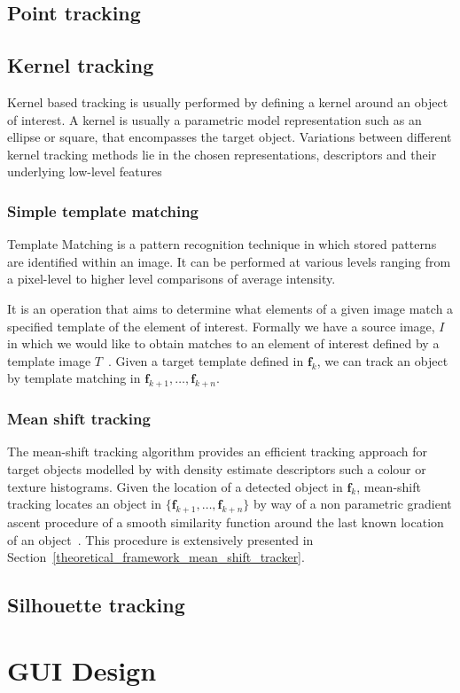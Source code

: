 
\subsection{Point tracking}


\subsection{Kernel tracking}
Kernel based tracking is usually performed by defining a kernel around an object
of interest. A kernel is usually a parametric model representation such as an
ellipse or square, that encompasses the target object. 
Variations between different kernel tracking methods lie in the chosen representations,
descriptors and their underlying low-level features~\cite{Prajapati2015}

\subsubsection{Simple template matching}
Template Matching is a pattern recognition technique in which stored patterns 
are identified within an image. It can be performed at various levels ranging
from a pixel-level to higher level comparisons of average intensity.

It is an operation that aims to determine what elements of a given image match a
specified template of the element of interest. Formally we have a source image,
$I$ in which we would like to obtain matches to an element of interest defined
by a template image $T$~\cite{Brunelli}. 
Given a target template defined in $\mathbf{f}_k$, we can track an object by 
template matching in $\mathbf{f}_{k+1},\ldots,\mathbf{f}_{k+n}$.

\subsubsection{Mean shift tracking}\label{literature_review_mean_shift}
The mean-shift tracking algorithm provides an efficient tracking approach for
target objects modelled by with density estimate descriptors such a colour or
texture histograms. 
Given the location of a detected object in $\mathbf{f}_k$, mean-shift tracking
locates an object in $\{\mathbf{f}_{k+1},\ldots,\mathbf{f}_{k+n}\}$ by way of a
non parametric gradient ascent procedure of a smooth similarity function around
the last known location of an object~\cite{Comaniciu2003}. This procedure is
extensively presented in Section~\ref{theoretical_framework_mean_shift_tracker}.

\subsection{Silhouette tracking}


\section{GUI Design}



